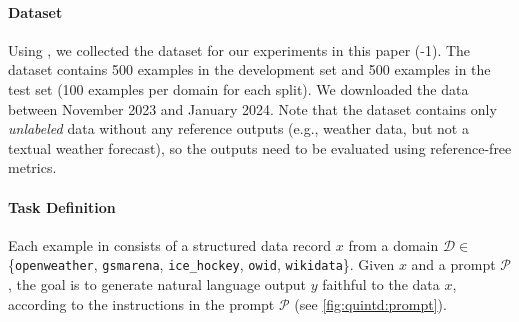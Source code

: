 \paragraph{\benchmark{} Dataset}
\label{sec:quintd:dataset}
Using \datatool{}, we collected the dataset for our experiments in this paper (\datatool{}-1). The dataset contains 500 examples in the development set and 500 examples in the test set (100 examples per domain for each split).
We downloaded the data between November 2023 and January 2024. Note that the dataset contains only \emph{unlabeled} data without any reference outputs (e.g., weather data, but not a textual weather forecast), so the outputs need to be evaluated using reference-free metrics.



\paragraph{Task Definition}
Each example in \benchmark{} consists of a structured data record $x$ from a domain $\mathcal{D} \in $ \{\texttt{openweather}, \texttt{gsmarena}, \texttt{ice\_hockey}, \texttt{owid}, \texttt{wikidata}\}. Given $x$ and a prompt $\mathcal{P}$, the goal is to generate natural language output $y$ faithful to the data $x$, according to the instructions in the prompt $\mathcal{P}$ (see \autoref{fig:quintd:prompt}).







